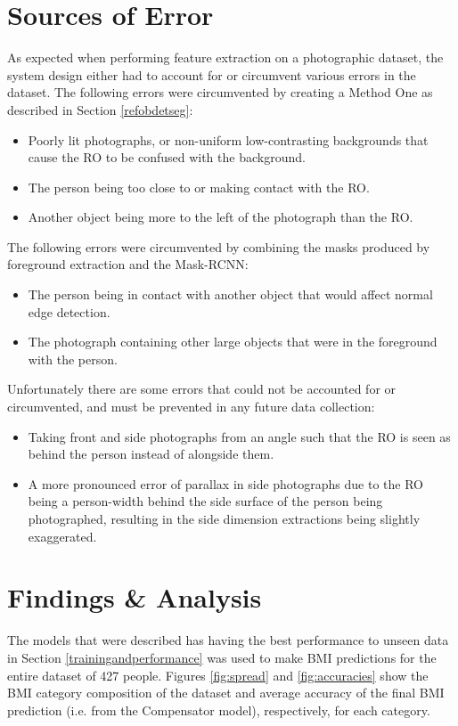\documentclass[conference]{IEEEtran}
\begin{document}
\section{Sources of Error} \label{error}
As expected when performing feature extraction on a photographic dataset, the system design either had to account for or circumvent various errors in the dataset.
The following errors were circumvented by creating a Method One as described in Section \ref{refobdetseg}:
\begin{itemize}
	\item Poorly lit photographs, or non-uniform low-contrasting backgrounds that cause the RO to be confused with the background.
	\item The person being too close to or making contact with the RO.
	\item Another object being more to the left of the photograph than the RO.
\end{itemize}
The following errors were circumvented by combining the masks produced by foreground extraction and the Mask-RCNN:
\begin{itemize}
	\item The person being in contact with another object that would affect normal edge detection.
	\item The photograph containing other large objects that were in the foreground with the person.
\end{itemize}
Unfortunately there are some errors that could not be accounted for or circumvented, and must be prevented in any future data collection:
\begin{itemize}
	\item Taking front and side photographs from an angle such that the RO is seen as behind the person instead of alongside them.
	\item A more pronounced error of parallax in side photographs due to the RO being a person-width behind the side surface of the person being photographed, resulting in the side dimension extractions being slightly exaggerated.
\end{itemize}

\section{Findings \& Analysis}
The models that were described has having the best performance to unseen data in Section \ref{trainingandperformance} was used to make BMI predictions for the entire dataset of 427 people.
Figures \ref{fig:spread} and \ref{fig:accuracies} show the BMI category composition of the dataset and average accuracy of the final BMI prediction (i.e. from the Compensator model), respectively, for each category.
\end{document}
